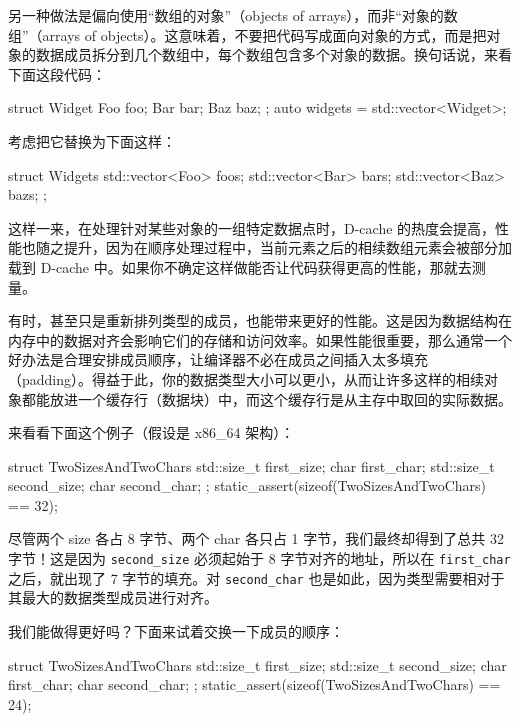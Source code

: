 另一种做法是偏向使用“数组的对象”（objects of arrays），而非“对象的数组”（arrays of objects）。这意味着，不要把代码写成面向对象的方式，而是把对象的数据成员拆分到几个数组中，每个数组包含多个对象的数据。换句话说，来看下面这段代码：

\begin{codebox}[cpp]
struct Widget {
    Foo foo;
    Bar bar;
    Baz baz;
};
auto widgets = std::vector<Widget>{};
\end{codebox}

\label{idx:1230}
考虑把它替换为下面这样：

\begin{codebox}[cpp]
struct Widgets {
    std::vector<Foo> foos;
    std::vector<Bar> bars;
    std::vector<Baz> bazs;
};
\end{codebox}

这样一来，在处理针对某些对象的一组特定数据点时，D-cache 的热度会提高，性能也随之提升，因为在顺序处理过程中，当前元素之后的相续数组元素会被部分加载到 D-cache 中。如果你不确定这样做能否让代码获得更高的性能，那就去测量。

有时，甚至只是重新排列类型的成员，也能带来更好的性能。这是因为数据结构在内存中的数据对齐会影响它们的存储和访问效率。如果性能很重要，那么通常一个好办法是合理安排成员顺序，让编译器不必在成员之间插入太多填充（padding）。得益于此，你的数据类型大小可以更小，从而让许多这样的相续对象都能放进一个缓存行（数据块）中，而这个缓存行是从主存中取回的实际数据。

来看看下面这个例子（假设是 x86\_64 架构）：

\begin{codebox}[cpp]
struct TwoSizesAndTwoChars {
    std::size_t first_size;
    char first_char;
    std::size_t second_size;
    char second_char;
};
static_assert(sizeof(TwoSizesAndTwoChars) == 32);
\end{codebox}

尽管两个 size 各占 8 字节、两个 char 各只占 1 字节，我们最终却得到了总共 32 字节！这是因为 \texttt{second\_\allowbreak{}size} 必须起始于 8 字节对齐的地址，所以在 \texttt{first\_\allowbreak{}char} 之后，就出现了 7 字节的填充。对 \texttt{second\_\allowbreak{}char} 也是如此，因为类型需要相对于其最大的数据类型成员进行对齐。

我们能做得更好吗？下面来试着交换一下成员的顺序：

\begin{codebox}[cpp]
struct TwoSizesAndTwoChars {
    std::size_t first_size;
    std::size_t second_size;
    char first_char;
    char second_char;
};
static_assert(sizeof(TwoSizesAndTwoChars) == 24);
\end{codebox}

